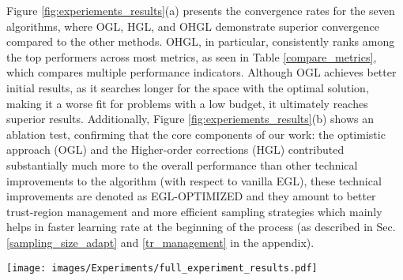 Figure \ref{fig:experiements_results}(a) presents the convergence rates for the seven algorithms, where OGL, HGL, and OHGL demonstrate superior convergence compared to the other methods. OHGL, in particular, consistently ranks among the top performers across most metrics, as seen in Table \ref{compare_metrics}, which compares multiple performance indicators. 
Although OGL achieves better initial results, as it searches longer for the space with the optimal solution, making it a worse fit for problems with a low budget, it ultimately reaches superior results.
Additionally, Figure \ref{fig:experiements_results}(b) shows an ablation test, confirming that the core components of our work: the optimistic approach (OGL) and the Higher-order corrections (HGL) contributed substantially much more to the overall performance than other technical improvements to the algorithm (with respect to vanilla EGL), these technical improvements are denoted as EGL-OPTIMIZED and they amount to better trust-region management and more efficient sampling strategies which mainly helps in faster learning rate at the beginning of the process (as described in Sec. \ref{sampling_size_adapt} and \ref{tr_management} in the appendix).
\begin{table*}[]
    \centering
    \scriptsize %
    \caption{Comparison of different metrics: Budget used to reach 0.99 of the final score ($\downarrow$), the mean normalized results ($\downarrow$), std ($\downarrow$); and percentage of solved problems ($\uparrow$).}
    \label{compare_metrics}
\end{table*}

\begin{figure*}[t]
    \centering
    \texttt{[image: images/Experiments/full\_experiment\_results.pdf]}
    \caption{Experiment results against the baseline: (a) Convergence for all our algorithms against baseline algorithms, (b) ablation test for EGL enhancements, (c) Success rate of algorithms as a function of the normalized distance from the best-known solution, (d) Percentage of solved algorithms when the distance from the best point is 0.01}
    \label{fig:experiements_results}
\end{figure*}

